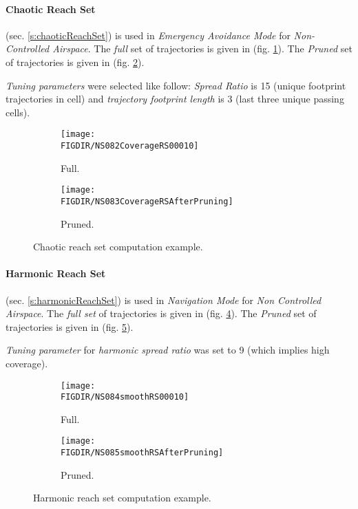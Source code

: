 \paragraph{Chaotic Reach Set} (sec. \ref{s:chaoticReachSet}) is used in \emph{Emergency Avoidance Mode} for \emph{Non-Controlled Airspace}. The \emph{full} set of trajectories is given in (fig. \ref{fig:chaoticComputed}). The \emph{Pruned} set of trajectories is given in (fig. \ref{fig:chaoticPruned}).

\emph{Tuning parameters} were selected like follow: \emph{Spread Ratio} is 15 (unique footprint trajectories in cell) and \emph{trajectory footprint length} is $3$ (last three unique passing cells). 


\begin{figure}[H]
    \centering
    \begin{subfigure}{0.48\textwidth}
    	\centering
        \texttt{[image: \\FIGDIR/NS082CoverageRS00010]}
        \caption{Full.}
        \label{fig:chaoticComputed}
    \end{subfigure}
    \begin{subfigure}{0.48\textwidth}
    	\centering
        \texttt{[image: \\FIGDIR/NS083CoverageRSAfterPruning]} 
        \caption{Pruned.}
        \label{fig:chaoticPruned}
    \end{subfigure}
    \caption{Chaotic reach set computation example.}
    \label{fig:chaoticReachSetComputationExample}
\end{figure}

\paragraph{Harmonic Reach Set} (sec. \ref{s:harmonicReachSet}) is used in \emph{Navigation Mode} for \emph{Non Controlled Airspace}. The \emph{full set} of trajectories is given in (fig. \ref{fig:harmonicComputed}). The \emph{Pruned} set of trajectories is given in (fig. \ref{fig:harmonicPruned}).

\emph{Tuning parameter} for \emph{harmonic spread ratio} was set to 9 (which implies high coverage).

\begin{figure}[H]
    \centering
    \begin{subfigure}{0.48\textwidth}
    	\centering
        \texttt{[image: \\FIGDIR/NS084smoothRS00010]}
        \caption{Full.}
        \label{fig:harmonicComputed}
    \end{subfigure}
    \begin{subfigure}{0.48\textwidth}
    	\centering
        \texttt{[image: \\FIGDIR/NS085smoothRSAfterPruning]} 
        \caption{Pruned.}
        \label{fig:harmonicPruned}
    \end{subfigure}
    \caption{Harmonic reach set computation example.}
    \label{fig:harmonicReachSetComputationExample}
\end{figure}

